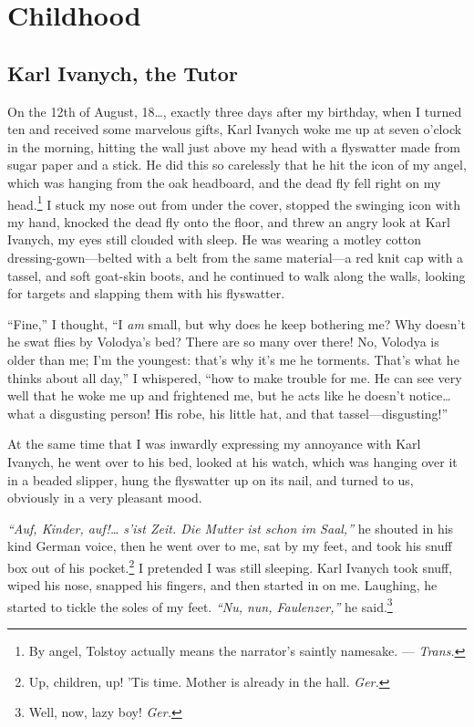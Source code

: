 \part*{Childhood}

\chapter{Karl Ivanych, the Tutor} %

On the 12th of August, 18\ldots{}, exactly three days after my birthday, when I turned ten and received some marvelous gifts, Karl Ivanych woke me up at seven o'clock in the morning, hitting the wall just above my head with a flyswatter made from sugar paper and a stick. He did this so carelessly that he hit the icon of my angel, which was hanging from the oak headboard, and the dead fly fell right on my head.\footnote{By angel, Tolstoy actually means the narrator's saintly namesake. --- \textit{Trans.}} I stuck my nose out from under the cover, stopped the swinging icon with my hand, knocked the dead fly onto the floor, and threw an angry look at Karl Ivanych, my eyes still clouded with sleep. He was wearing a motley cotton dressing-gown---belted with a belt from the same material---a red knit cap with a tassel, and soft goat-skin  boots, and he continued to walk along the walls, looking for targets and slapping them with his flyswatter.

``Fine,'' I thought, ``I \emph{am} small, but why does he keep bothering me? Why doesn't he swat flies by Volodya's bed? There are so many over there! No, Volodya is older than me; I'm the youngest: that's why it's me he torments. That's what he thinks about all day,'' I whispered, ``how to make trouble for me. He can see very well that he woke me up and frightened me, but he acts like he doesn't notice\ldots{} what a disgusting person! His robe, his little hat, and that tassel---disgusting!'' %

At the same time that I was inwardly expressing my annoyance with Karl Ivanych, he went over to his bed, looked at his watch, which was hanging over it in a beaded slipper, hung the flyswatter up on its nail, and turned to us, obviously in a very pleasant mood.

\textit{``Auf, Kinder, auf!\ldots{} s'ist Zeit. Die Mutter ist schon im Saal,''} he shouted in his kind German voice, then he went over to me, sat by my feet, and took his snuff box out of his pocket.\footnote{Up, children, up! 'Tis time. Mother is already in the hall. \textit{Ger.}} I pretended I was still sleeping. Karl Ivanych took snuff, wiped his nose, snapped his fingers, and then started in on me. Laughing, he started to tickle the soles of my feet. \textit{``Nu, nun, Faulenzer,''} he said.\footnote{Well, now, lazy boy! \textit{Ger.}} %

